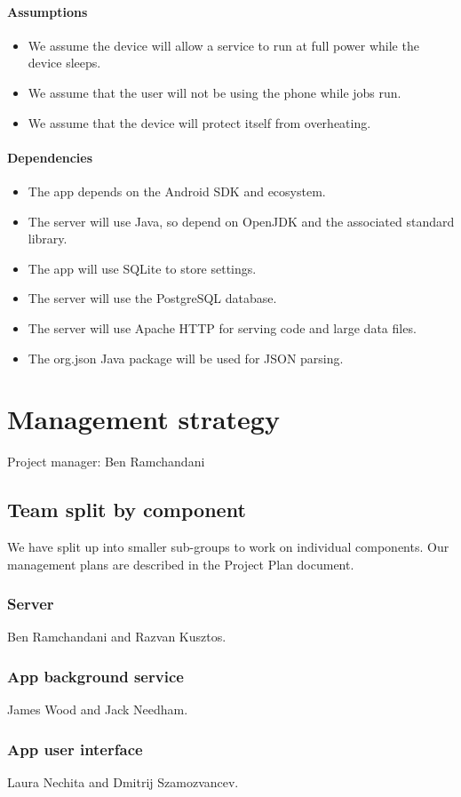 \documentclass[a4paper,10pt]{article}
\begin{document}
\paragraph{Assumptions}
\begin{itemize}
	\item We assume the device will allow a service to run at full power while the device sleeps.
	\item We assume that the user will not be using the phone while jobs run.
	\item We assume that the device will protect itself from overheating.
\end{itemize} 

\paragraph{Dependencies}
\begin{itemize}
\item The app depends on the Android SDK and ecosystem.
\item The server will use Java, so depend on OpenJDK and the associated standard library.
\item The app will use SQLite to store settings.
\item The server will use the PostgreSQL database.
\item The server will use Apache HTTP for serving code and large data files.
\item The org.json Java package will be used for JSON parsing.
\end{itemize}

\newpage
\section{Management strategy}

Project manager: Ben Ramchandani

\subsection{Team split by component}

We have split up into smaller sub-groups to work on individual components.
Our management plans are described in the Project Plan document.

\subsubsection{Server}

Ben Ramchandani and Razvan Kusztos.

\subsubsection{App background service}

James Wood and Jack Needham.

\subsubsection{App user interface}

Laura Nechita and Dmitrij Szamozvancev.
\end{document}
